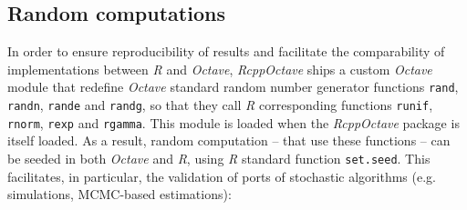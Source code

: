 \documentclass[english,10pt,a4paper]{article}\usepackage{graphicx, color}
\let\proglang=\textit
\let\code=\texttt
\newcommand{\pkgname}[1]{\textit{#1}\xspace}
\newcommand{\Rpkg}[1]{\pkgname{#1} package\xspace}
\newcommand{\R}{\proglang{R}\xspace}
\newcommand{\octave}{\proglang{Octave}\xspace}
\begin{document}
\subsection{Random computations}

In order to ensure reproducibility of results and facilitate the comparability
of implementations between \R and \octave, \pkgname{RcppOctave} ships
a custom \octave module that redefine \octave standard random number generator
functions \code{rand}, \code{randn}, \code{rande} and \code{randg}, so that they
call \R corresponding functions \code{runif}, \code{rnorm}, \code{rexp} and
\code{rgamma}.
This module is loaded when the \Rpkg{RcppOctave} is itself loaded.
As a result, random computation -- that use these functions -- can be seeded in
both \octave and \R, using \R standard function \code{set.seed}.
This facilitates, in particular, the validation of ports of stochastic
algorithms (e.g. simulations, MCMC-based estimations):
\end{document}
